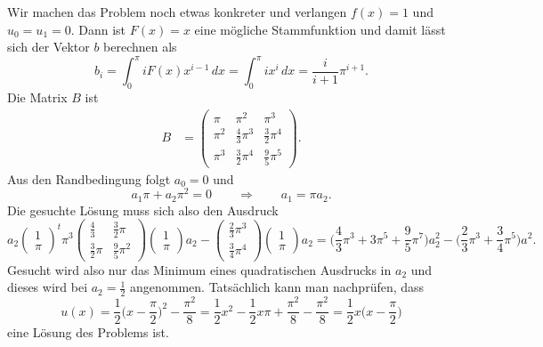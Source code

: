 Wir machen das Problem noch etwas konkreter und verlangen $f(x)=1$
und $u_0=u_1=0$.
Dann ist $F(x)=x$ eine mögliche Stammfunktion und damit lässt sich
der Vektor $b$ berechnen als
\[
b_i
=
\int_0^\pi i F(x) x^{i-1}\,dx
=
\int_0^\pi i x^i\,dx
=
\frac{i}{i+1}
\pi^{i+1}.
\]
Die Matrix $B$ ist
\begin{align*}
B&=\begin{pmatrix}
\pi   & \pi^2            & \pi^3            \\
\pi^2 & \frac{4}{3}\pi^3 & \frac{3}{2}\pi^4 \\
\pi^3 & \frac{3}{2}\pi^4 & \frac{9}{5}\pi^5
\end{pmatrix}.
\end{align*}
Aus den Randbedingung folgt $a_0=0$ und
\[
a_1\pi+a_2\pi^2=0
\qquad\Rightarrow\qquad
a_1 = \pi a_2.
\]
Die gesuchte Lösung muss sich also den Ausdruck
\[
a_2
\begin{pmatrix}
1\\\pi
\end{pmatrix}^t
\pi^3
\begin{pmatrix}
\frac43   &\frac32\pi\\
\frac32\pi&\frac95\pi^2
\end{pmatrix}
\begin{pmatrix}
1\\\pi
\end{pmatrix}
a_2
-
\begin{pmatrix}
\frac23\pi^3\\\frac34\pi^4
\end{pmatrix}
\begin{pmatrix}
1\\\pi
\end{pmatrix}
a_2
=
\biggl(
\frac43\pi^3+3\pi^5 +\frac95\pi^7
\biggr)
a_2^2
-\biggl(\frac23\pi^3+\frac34\pi^5\biggr)
a^2.
\]
Gesucht wird also nur das Minimum eines quadratischen Ausdrucks 
in $a_2$ und dieses wird bei $a_2=\frac12$ angenommen.
Tatsächlich kann man nachprüfen, dass
\[
u(x)
=
\frac12\biggl(x-\frac{\pi}2\biggr)^2 -\frac{\pi^2}8
=
\frac12x^2 -\frac12 x\pi +\frac{\pi^2}8 - \frac{\pi^2}8
=
\frac12x\biggl(x-\frac{\pi}2\biggr)
\]
eine Lösung des Problems ist.

